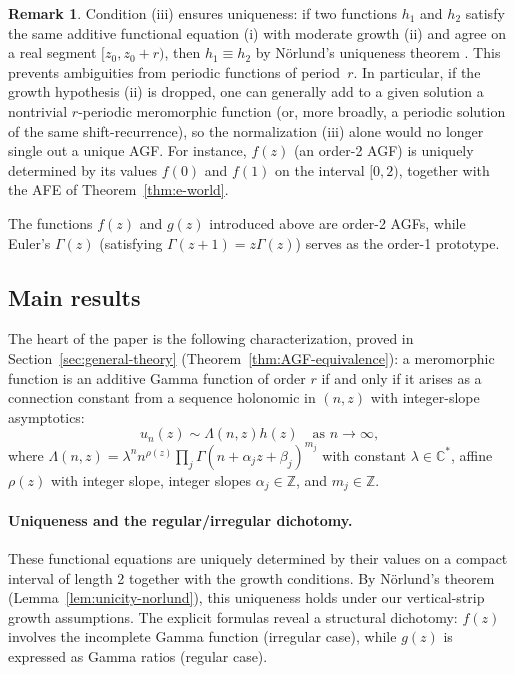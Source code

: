 \documentclass[11pt,reqno]{amsart}
\theoremstyle{definition}
\newtheorem{remark}[theorem]{Remark}
\newcommand{\Z}{\mathbb{Z}}
\newcommand{\C}{\mathbb{C}}
\numberwithin{equation}{section}
\begin{document}
\begin{remark}
Condition (iii) ensures uniqueness: if two functions $h_1$ and $h_2$ satisfy the same additive functional equation (i) with moderate growth (ii) and agree on a real segment $[z_0, z_0+r)$, then $h_1 \equiv h_2$ by Nörlund's uniqueness theorem \cite[Chapter IV, Theorem 1]{Norlund1924}. This prevents ambiguities from periodic functions of period~$r$. In particular, if the growth hypothesis (ii) is dropped, one can generally add to a given solution a nontrivial $r$-periodic meromorphic function (or, more broadly, a periodic solution of the same shift-recurrence), so the normalization (iii) alone would no longer single out a unique AGF. For instance, $f(z)$ (an order-2 AGF) is uniquely determined by its values $f(0)$ and $f(1)$ on the interval $[0,2)$, together with the AFE of Theorem~\ref{thm:e-world}.
\end{remark}

The functions $f(z)$ and $g(z)$ introduced above are order-2 AGFs, while Euler's $\Gamma(z)$ (satisfying $\Gamma(z+1) = z\Gamma(z)$) serves as the order-1 prototype.

\subsection{Main results}

The heart of the paper is the following characterization, proved in Section~\ref{sec:general-theory} 
(Theorem~\ref{thm:AGF-equivalence}): a meromorphic function is an additive Gamma 
function of order $r$ if and only if it arises as a connection constant from a 
sequence holonomic in $(n,z)$ with integer-slope asymptotics:
$$u_n(z) \sim \Lambda(n,z)h(z) \quad \text{as } n \to \infty,$$
where $\Lambda(n,z) = \lambda^n n^{\rho(z)} \prod_j \Gamma(n+\alpha_j z+\beta_j)^{m_j}$
with constant $\lambda\in\C^*$, affine $\rho(z)$ with integer slope, integer slopes $\alpha_j\in\Z$, and $m_j\in\Z$.

\paragraph{Uniqueness and the regular/irregular dichotomy.}
These functional equations are uniquely determined by their values on a compact interval of length 2 together with the growth conditions.
By Nörlund's theorem (Lemma~\ref{lem:unicity-norlund}),
this uniqueness holds under our vertical-strip growth assumptions.
The explicit formulas reveal a structural dichotomy: $f(z)$ involves the incomplete Gamma function (irregular case), while $g(z)$ is expressed as Gamma ratios (regular case).
\end{document}
